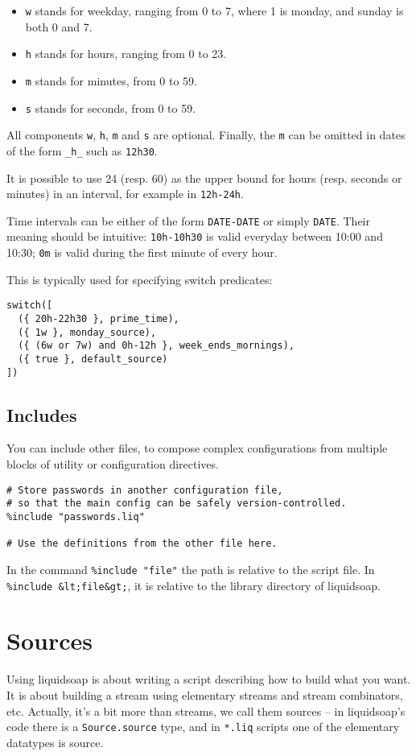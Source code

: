 \begin{itemize}
\item \verb+w+ stands for weekday, ranging from 0 to 7, where 1 is monday, and sunday is both 0 and 7.
\item \verb+h+ stands for hours, ranging from 0 to 23.
\item \verb+m+ stands for minutes, from 0 to 59.
\item \verb+s+ stands for seconds, from 0 to 59.

\end{itemize}
All components \verb+w+, \verb+h+, \verb+m+ and \verb+s+ are optional. Finally, the \verb+m+ can be omitted in dates of the form \verb+_h_+ such as \verb+12h30+.

It is possible to use 24 (resp. 60) as the upper bound for hours (resp. seconds or minutes) in an interval, for example in \verb+12h-24h+.

Time intervals can be either of the form \verb+DATE-DATE+ or simply \verb+DATE+. Their meaning should be intuitive: \verb+10h-10h30+ is valid everyday between 10:00 and 10:30; \verb+0m+ is valid during the first minute of every hour.

This is typically used for specifying switch predicates:

\begin{verbatim}
switch([
  ({ 20h-22h30 }, prime_time),
  ({ 1w }, monday_source),
  ({ (6w or 7w) and 0h-12h }, week_ends_mornings),
  ({ true }, default_source)
])
\end{verbatim}
\subsection{Includes}
You can include other files,
to compose complex configurations from
multiple blocks of utility or configuration directives.

\begin{verbatim}
# Store passwords in another configuration file,
# so that the main config can be safely version-controlled.
%include "passwords.liq"

# Use the definitions from the other file here.
\end{verbatim}
In the command \verb+%include "file"+ the path is relative to
the script file. In \verb+%include &lt;file&gt;+, it is relative
to the library directory of liquidsoap.


\section{Sources}
Using liquidsoap is about writing a script describing how to build what you want. It is about building a stream using elementary streams and stream combinators, etc. Actually, it's a bit more than streams, we call them sources -- in liquidsoap's code there is a \verb+Source.source+ type, and in \verb+*.liq+ scripts one of the elementary datatypes is source.

